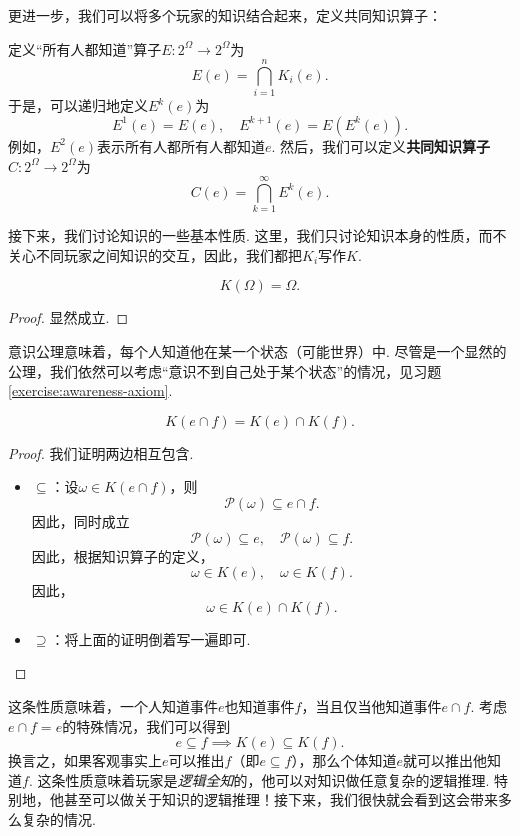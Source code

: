 更进一步，我们可以将多个玩家的知识结合起来，定义共同知识算子：

\begin{definition}[共同知识算子]
定义“所有人都知道”算子$E:2^\Omega\to 2^\Omega$为
\[E(e)=\bigcap_{i=1}^n K_i(e).\]
于是，可以递归地定义$E^k(e)$为
\[E^1(e)=E(e),\quad E^{k+1}(e)=E(E^k(e)).\]
例如，$E^2(e)$表示所有人都所有人都知道$e$. 然后，我们可以定义\textbf{共同知识算子}$C:2^\Omega\to 2^\Omega$为
\[C(e)=\bigcap_{k=1}^\infty E^k(e).\]
\end{definition}

接下来，我们讨论知识的一些基本性质. 这里，我们只讨论知识本身的性质，而不关心不同玩家之间知识的交互，因此，我们都把$K_i$写作$K$.

\begin{proposition}[意识公理]
    \begin{equation}
        K(\Omega)=\Omega.\tag{K0}\label{eq:K0-awareness}
    \end{equation}
\end{proposition}
\begin{proof}
    显然成立. 
\end{proof}

意识公理意味着，每个人知道他在某一个状态（可能世界）中. 尽管是一个显然的公理，我们依然可以考虑“意识不到自己处于某个状态”的情况，见习题 \ref{exercise:awareness-axiom}.

\begin{proposition}
    \begin{equation}
        K(e\cap f)=K(e)\cap K(f).\tag{K1}\label{eq:K1-intersection}
    \end{equation}
\end{proposition}
\begin{proof}
    我们证明两边相互包含. 
    \begin{itemize}
        \item $\subseteq$：设$\omega\in K(e\cap f)$，则
        \[\mathcal P(\omega)\subseteq e\cap f.\]
        因此，同时成立
        \[\mathcal P(\omega)\subseteq e,\quad \mathcal P(\omega)\subseteq f.\]
        因此，根据知识算子的定义，
        \[\omega\in K(e),\quad \omega\in K(f).\]
        因此，
        \[\omega\in K(e)\cap K(f).\]
        \item $\supseteq$：将上面的证明倒着写一遍即可. 
    \end{itemize}
\end{proof}

这条性质意味着，一个人知道事件$e$也知道事件$f$，当且仅当他知道事件$e\cap f$. 考虑$e\cap f=e$的特殊情况，我们可以得到
\[e\subseteq f\implies K(e)\subseteq K(f).\]
换言之，如果客观事实上$e$可以推出$f$（即$e\subseteq f$），那么个体知道$e$就可以推出他知道$f$. 这条性质意味着玩家是\textit{逻辑全知}的，他可以对知识做任意复杂的逻辑推理. 特别地，他甚至可以做关于知识的逻辑推理！接下来，我们很快就会看到这会带来多么复杂的情况. 

